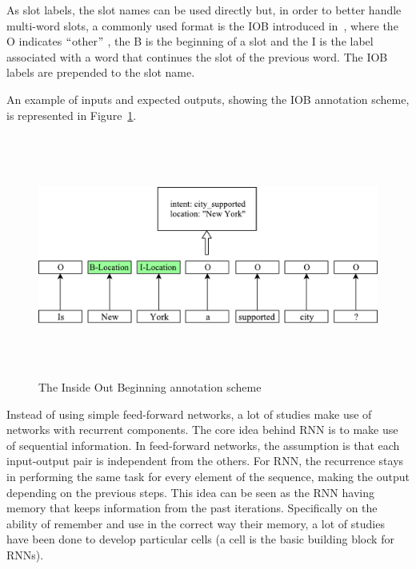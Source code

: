 As slot labels, the slot names can be used directly but, in order to better handle multi-word slots, a commonly used format is the IOB introduced in~\cite{ramshaw1999text}, where the O indicates $``$other$"$ , the B is the beginning of a slot and the I is the label associated with a word that continues the slot of the previous word. The IOB labels are prepended to the slot name.

An example of inputs and expected outputs, showing the IOB annotation scheme, is represented in Figure~\ref{fig:iob}.


\begin{figure}[!htbp]
    \centering
    \includegraphics[max width=\linewidth,max height=8cm,keepaspectratio]{figures/iob}
    \caption{The Inside Out Beginning annotation scheme}\label{fig:iob}
\end{figure}

Instead of using simple feed-forward networks, a lot of studies make use of networks with recurrent components. The core idea behind RNN is to make use of sequential information. In feed-forward networks, the assumption is that each input-output pair is independent from the others. For RNN, the recurrence stays in performing the same task for every element of the sequence, making the output depending on the previous steps. This idea can be seen as the RNN having memory that keeps information from the past iterations. Specifically on the ability of remember and use in the correct way their memory, a lot of studies have been done to develop particular cells (a cell is the basic building block for RNNs).


